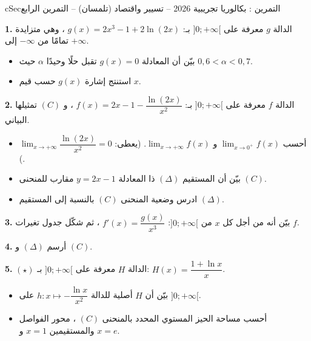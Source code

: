\documentclass[12pt,a4paper]{article}
\newenvironment{BOX}[2]{\begin{otherlanguage}{english}\begin{arbox}{#1}{#2}}{\end{arbox}\end{otherlanguage}}
\newcounter{exo}
\newenvironment{tamrin}[1]{\stepcounter{exo}\begin{BOX}{cSec}{التمرين \theexo: #1}}{\end{BOX}}
\newenvironment{sq}{\begin{itemize}[leftmargin=2.4em,itemsep=3pt]}{\end{itemize}}
\newcommand{\qa}{\item[(أ)]}\newcommand{\qb}{\item[(ب)]}\newcommand{\qc}{\item[(جـ)]}\newcommand{\qd}{\item[(د)]}\newcommand{\qe}{\item[(هـ)]}
\newcommand{\QQ}[1]{\par\smallskip\textbf{#1.} }
\newcommand{\Lm}[1]{\displaystyle\lim_{x\to#1}}
\begin{document}
\begin{tamrin}{بكالوريا تجريبية 2026 -- تسيير واقتصاد (تلمسان) -- التمرين الرابع}
\QQ{1} الدالة $g$ معرفة على $]0;+\infty[$ بـ: $g(x)=2x^3-1+2\ln(2x)$ ، وهي متزايدة تمامًا من $-\infty$ إلى $+\infty$.
\begin{sq}
\qa بيّن أن المعادلة $g(x)=0$ تقبل حلًا وحيدًا $\alpha$ حيث $0{,}6<\alpha<0{,}7$.
\qb استنتج إشارة $g(x)$ حسب قيم $x$.
\end{sq}
\QQ{2} الدالة $f$ معرفة على $]0;+\infty[$ بـ: $f(x)=2x-1-\dfrac{\ln(2x)}{x^2}$ ، و $(C)$ تمثيلها البياني.
\begin{sq}
\qa أحسب $\Lm{0^+}f(x)$ و $\Lm{+\infty}f(x)$. (يعطى: $\Lm{+\infty}\dfrac{\ln(2x)}{x^2}=0$).
\qb بيّن أن المستقيم $(\Delta)$ ذا المعادلة $y=2x-1$ مقارب للمنحنى $(C)$.
\qc ادرس وضعية المنحنى $(C)$ بالنسبة إلى المستقيم $(\Delta)$.
\end{sq}
\QQ{3} بيّن أنه من أجل كل $x$ من $]0;+\infty[$: $f'(x)=\dfrac{g(x)}{x^3}$ ، ثم شكّل جدول تغيرات $f$.
\QQ{4} أرسم $(\Delta)$ و $(C)$.
\QQ{5} $(\star)$ الدالة $H$ معرفة على $]0;+\infty[$ بـ: $H(x)=\dfrac{1+\ln x}{x}$.
\begin{sq}
\qa بيّن أن $H$ أصلية للدالة $h:x\mapsto-\dfrac{\ln x}{x^2}$ على $]0;+\infty[$.
\qb أحسب مساحة الحيز المستوي المحدد بالمنحنى $(C)$ ، محور الفواصل والمستقيمين $x=1$ و $x=e$.
\end{sq}
\end{tamrin}
\end{document}
